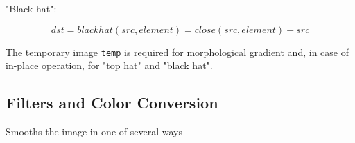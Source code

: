 "Black hat":

\[
dst=blackhat(src,element)=close(src,element)-src
\]

The temporary image \texttt{temp} is required for morphological gradient and, in case of in-place operation, for "top hat" and "black hat".

\subsection{Filters and Color Conversion}

\label{Smooth}

Smooths the image in one of several ways


